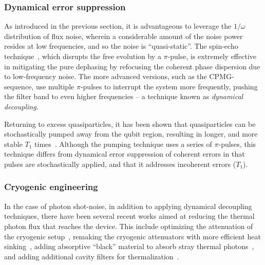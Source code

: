 \documentclass[aip,apr,twocolumn,showpacs,superscriptaddress,groupedaddress,nofootinbib,reprint]{revtex4-1}  %
\begin{document}
\subsubsection{Dynamical error suppression}

As introduced in the previous section, it is advantageous to leverage the $1/\omega$ distribution of flux noise, wherein a considerable amount of the noise power resides at low frequencies, and so the noise is ``quasi-static''.
The spin-echo technique~\cite{Hahn1950}, which disrupts the free evolution by a $\pi$-pulse, is extremely effective in mitigating the pure dephasing by refocusing the coherent phase dispersion due to low-frequency noise.
The more advanced versions, such as the CPMG-sequence, use multiple $\pi$-pulses to interrupt the system more frequently, pushing the filter band to even higher frequencies -- a technique known as \textit{dynamical decoupling}\cite{Bylander2011}.

Returning to excess quasiparticles, it has been shown that quasiparticles can be stochastically pumped away from the qubit region, resulting in longer, and more stable $T_1$ times~\cite{Gustavsson2016}. Although the pumping technique uses a series of $\pi$-pulses, this technique differs from dynamical error suppression of coherent errors in that pulses are stochastically applied, and that it addresses incoherent errors ($T_1$).

\subsubsection{Cryogenic engineering}
In the case of photon shot-noise, in addition to applying dynamical decoupling techniques, there have been several recent works aimed at reducing the thermal photon flux that reaches the device. This include optimizing the attenuation of the cryogenic setup~\cite{Yan2018,Krinner2018,Jin2015}, remaking the cryogenic attenuators with more efficient heat sinking~\cite{Yeh2017}, adding absorptive ``black'' material to absorb stray thermal photons~\cite{Barends2011,Corcoles2011}, and adding additional cavity filters for thermalization~\cite{Wang2019}.
\end{document}
